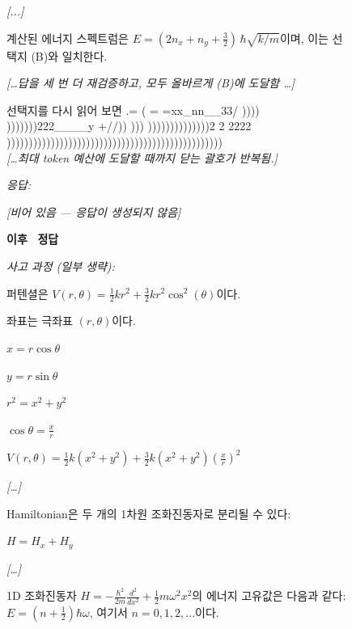 \begin{figure}[t]
\begin{minipage}[t]{0.49\textwidth}
\begin{mdframed}[style=beforebox]
\begin{mdframed}[style=thinkbox]
\textit{[...]}

계산된 에너지 스펙트럼은 $E = (2n_x + n_y + \tfrac{3}{2})\,\hbar\sqrt{k/m}$이며, 이는 선택지 (B)와 일치한다.

\medskip
\textit{[\ldots 답을 세 번 더 재검증하고, 모두 올바르게 (B)에 도달함 \ldots]}

\medskip
\noindent 선택지를 다시 읽어 보면
\quad .\qquad = ( = =xx\_nn\_\_33/ \qquad ))))
\smallskip
)))))))222\_\_\_\_y +//)) ))) ))))))))))))))2 2 2222\\
)))))))))))))))))))))))))))))))))))))))))))))))))\\
{\itshape [\ldots 최대 token 예산에 도달할 때까지 닫는 괄호가 반복됨.]}
\end{mdframed}
\vspace{2pt}
\noindent\textit{응답:}
\begin{mdframed}[style=thinkbox]
\textit{[비어 있음 --- 응답이 생성되지 않음]}
\end{mdframed}
\end{mdframed}
\end{minipage}%
\hfill
\begin{minipage}[t]{0.49\textwidth}
\begin{mdframed}[style=afterbox]
\noindent\textbf{\sdrlfootnotesize 이후} \hfill {\colorbox{afterbg}{\textcolor{afterframe}{\textbf{\checkmark~정답}}}}

\noindent\textit{사고 과정 (일부 생략):}
\begin{mdframed}[style=thinkbox]
퍼텐셜은 $V(r, \theta) = \frac{1}{2}kr^2 + \frac{3}{2}kr^2\cos^2(\theta)$이다.

\quad 좌표는 극좌표 $(r, \theta)$이다.

\quad $x = r\cos\theta$

\quad $y = r\sin\theta$

\quad $r^2 = x^2 + y^2$

\quad $\cos\theta = \frac{x}{r}$

\quad $V(r, \theta) = \frac{1}{2}k(x^2+y^2) + \frac{3}{2}k(x^2+y^2)(\frac{x}{r})^2$

\textit{[\ldots]}

Hamiltonian은 두 개의 1차원 조화진동자로 분리될 수 있다:

\quad $H = H_x + H_y$

\textit{[\ldots]}

1D 조화진동자 $H = -\frac{\hbar^2}{2m}\frac{d^2}{dx^2} + \frac{1}{2}m\omega^2x^2$의 에너지 고유값은 다음과 같다:
    $E = (n+\frac{1}{2})\hbar\omega$, 여기서 $n = 0, 1, 2, ...$이다.


\end{mdframed}
\end{mdframed}
\end{minipage}
\end{figure}
